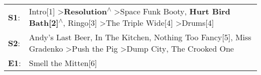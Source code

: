 \begin{supertabular}{p{0.03\textwidth}p{0.92\textwidth}}
 \textbf{S1}:  &  Intro[1]\textsuperscript{} \textgreater \enspace \textbf{Resolution\textsuperscript{$\wedge$}} \textgreater \enspace Space Funk Booty\textsuperscript{}, \enspace \textbf{Hurt Bird Bath[2]\textsuperscript{$\wedge$}}, \enspace Ringo[3]\textsuperscript{} \textgreater \enspace The Triple Wide[4]\textsuperscript{} \textgreater \enspace Drums[4]\textsuperscript{}  \enspace  \\
 \textbf{S2}:  &                                              Andy's Last Beer\textsuperscript{}, \enspace In The Kitchen\textsuperscript{}, \enspace Nothing Too Fancy[5]\textsuperscript{}, \enspace Miss Gradenko\textsuperscript{} \textgreater \enspace Push the Pig\textsuperscript{} \textgreater \enspace Dump City\textsuperscript{}, \enspace The Crooked One\textsuperscript{}  \enspace  \\
 \textbf{E1}:  &                                                                                                                                                                                                                                                                                                                                    Smell the Mitten[6]\textsuperscript{}  \enspace  \\
\end{supertabular}
